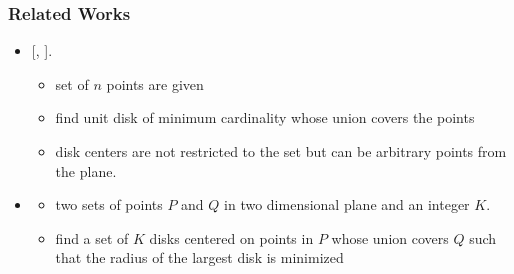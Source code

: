 \documentclass[blue]{beamer}
\begin{document}

\begin{frame}
 \frametitle{Related Works }
 \begin{itemize}
  \item {}  [\cite{T91}, \cite{DW85}].
   \begin{itemize}
    \item set of $n$ points are given
    \item  find unit disk of minimum cardinality whose union covers the points 
     \item  disk centers are not restricted to the set but can be arbitrary points from the plane.
   \end{itemize}
  \item {}
   \begin{itemize}
     \item two sets of points $P$ and $Q$ in two dimensional plane and an integer $K$.
     \item find a set of $K$ disks centered on points in $P$ whose union covers
            $Q$ such that the radius of the largest disk is minimized
   \end{itemize}
   \end{itemize}
  \end{frame}  
\end{document}
